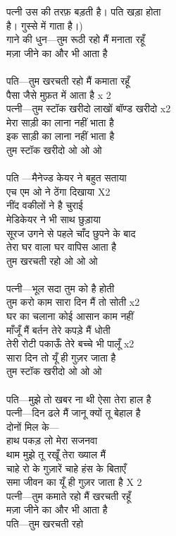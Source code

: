 {{{{{{{{{{पत्नी उस की तरफ़ बड़ती है। पति खड़ा होता\\
है। गुस्से में गाता है।) \\
गाने की धुन—तुम रूठी रहो मैं मनाता रहूँ\\
मज़ा जीने का और भी आता है\\
\\
पति—तुम खरचती रहो मैं कमाता रहूँ\\
पैसा जैसे मुफ़त में आता है x 2\\
पत्नी—तुम स्टॉक खरीदो लाखों बॉण्ड खरीदो x2 \\
मेरा साड़ी का लाना नहीं भाता है\\
इक साड़ी का लाना नहीं भाता है\\
तुम स्टॉक खरीदो ओ ओ ओ\\
\\
पति —मैनेज्ड केयर ने बहुत सताया\\
एच एम ओ ने ठेंगा दिखाया X2\\
नींद वकीलों ने है चुराई\\
मेडिकेयर ने भी साथ छुड़ाया\\
सूरज उगने से पहले चाँद छुपने के बाद\\
तेरा घर वाला घर वापिस आता है\\
तुम खरचती रहो ओ ओ ओ\\
\\
पत्नी—भूल सदा तुम को है होती\\
तुम करो काम सारा दिन मैं तो सोती x2\\
घर का चलाना कोई आसान काम नहीं\\
माँजूँ मैं बर्तन तेरे कपड़े मैं धोती\\
तेरी रोटी पकाऊँ तेरे बच्चे भी पालूँ x2\\
सारा दिन तो यूँ ही गुज़र जाता है\\
तुम स्टॉक खरीदो ओ ओ ओ\\
\\
पति—मुझे तो खबर ना थी ऐसा तेरा हाल है\\
पत्नी—दिन ढले मैं जानू क्यों तू बेहाल है\\
दोनों मिल के—\\
हाथ पकड़ लो मेरा सजनवा\\
थाम मुझे तू रखूँ तेरा ख्याल मैं\\
चाहे रो के गुज़ारें चाहे हंस के बिताएँ\\
समा जीवन का यूँ ही गुज़र जाता है X 2\\
पत्नी—तुम कमाते रहो मैं खरचती रहूँ\\
मज़ा जीने का और भी आता है\\
पति—तुम खरचती रहो\\
}}}}}}}}}}
